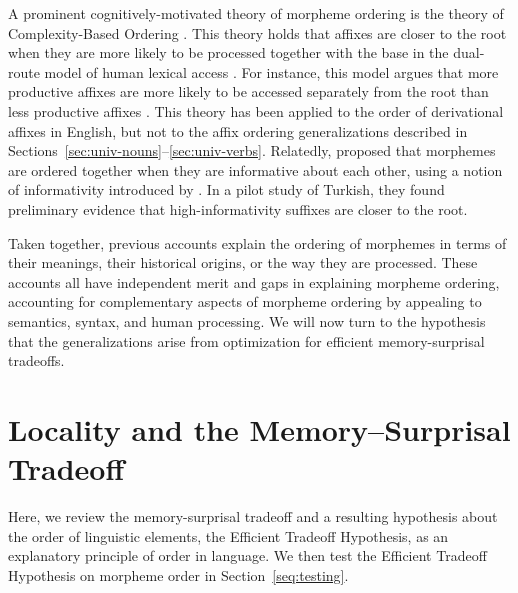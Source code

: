 \documentclass[11pt,letterpaper]{article}
\newcommand{\citep}{\parencite}
\newcommand{\citet}{\Textcite}
\newcommand{\jd}[1]{\textcolor{Pink}{[jd: #1]}}
\begin{document}
A prominent cognitively-motivated theory of morpheme ordering is the theory of Complexity-Based Ordering \citep{hay2002speech,plag2002the,hay2004what,hay2005shifting,plag2009suffix}.
This theory holds that affixes are closer to the root when they are more likely to be processed together with the base in the dual-route model of human lexical access   \citep{baayen1993on}.
For instance, this model argues that more productive affixes are more likely to be accessed separately from the root than less productive affixes  \citep{baayen1993on}.
This theory has been applied to the order of derivational affixes in English,  but not to the affix ordering generalizations described in Sections~\ref{sec:univ-nouns}--\ref{sec:univ-verbs}.
Relatedly, \citet{inkelas2016affix} proposed that morphemes are ordered together when they are informative about each other, using a notion of informativity introduced by \citet{priva2017informativity}. In a pilot study of Turkish, they found preliminary evidence that high-informativity suffixes are closer to the root.




Taken together, previous accounts explain the ordering of morphemes in terms of their meanings, their historical origins, or the way they are processed.
These accounts all have independent merit and gaps in explaining morpheme ordering, accounting for complementary aspects of morpheme ordering by appealing to semantics, syntax, and human processing.
We will now turn to the hypothesis that the generalizations arise from optimization for efficient memory-surprisal tradeoffs.


\section{Locality and the Memory--Surprisal Tradeoff}

Here, we review the memory-surprisal tradeoff and a resulting hypothesis about the order of linguistic elements, the Efficient Tradeoff Hypothesis, as an explanatory principle of order in language. We then test the Efficient Tradeoff Hypothesis on morpheme order in Section~\ref{seq:testing}.

\end{document}
